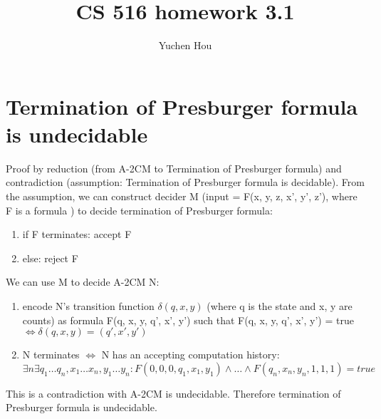 \documentclass{article}
\begin{document}
\lstset{language=python, tabsize=4}
\title{CS 516 homework 3.1}
\author{Yuchen Hou}
\maketitle

\section{Termination of Presburger formula is undecidable}
Proof by reduction (from A-2CM to Termination of Presburger formula) and 
contradiction (assumption: Termination of Presburger formula is decidable). 
From the assumption, we can construct decider M (input = F(x, y, z, x', y', 
z'), where F is a formula ) to decide termination of Presburger formula:
\begin{enumerate}
	\item if F terminates: accept F
	\item else: reject F
\end{enumerate}
We can use M to decide A-2CM N:
\begin{enumerate}
	\item encode N's transition function $ \delta(q, x, y) $ 
	(where q is the state and x, y are counts) as formula F(q, x, y, q', x', 
	y') such 
	that F(q, x, y, q', x', y') = true $ \iff \delta(q, x, y) = (q', x', y') $
	\item N terminates $ \iff $ N has an accepting computation history: $ 
	\exists n \exists q_1 \dots q_n, x_1 \dots x_n, y_1 \dots y_n : F(0, 0, 0, 
	q_1, x_1, y_1) \land \dots \land F(q_n, x_n, y_n, 1, 1, 1) = true$
\end{enumerate}
This is a contradiction with A-2CM is undecidable. Therefore termination of 
Presburger formula is undecidable.
\end{document}
